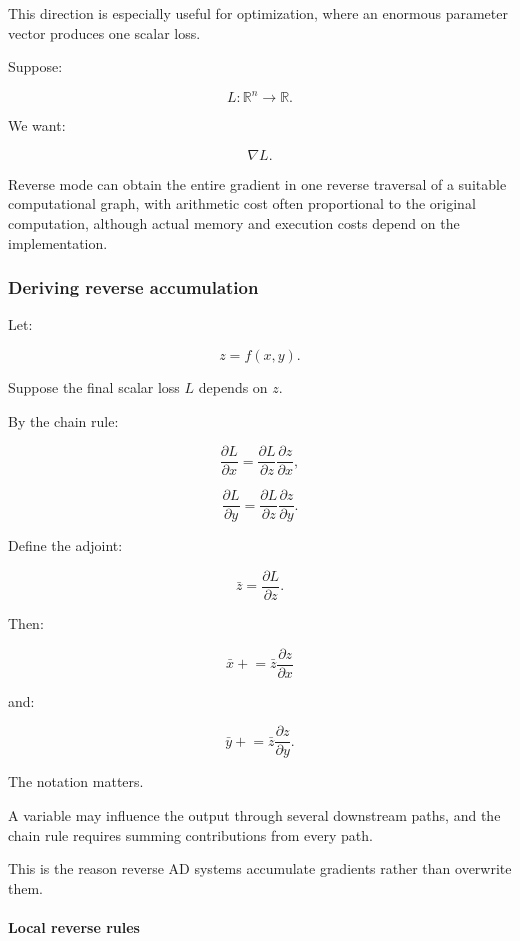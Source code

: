 This direction is especially useful for optimization, where an enormous parameter vector produces one scalar loss.

Suppose:

\[
L:\mathbb R^n\rightarrow\mathbb R.
\]

We want:

\[
\nabla L.
\]

Reverse mode can obtain the entire gradient in one reverse traversal of a suitable computational graph, with arithmetic cost often proportional to the original computation, although actual memory and execution costs depend on the implementation.

\subsubsection{Deriving reverse accumulation}\label{02-foundations-ii-ch022-deriving-reverse-accumulation}

\hypertarget{02-foundations-ii-ch022-deriving-reverse-accumulation}{}

Let:

\[
z=f(x,y).
\]

Suppose the final scalar loss \(L\) depends on \(z\).

By the chain rule:

\[
\frac{\partial L}{\partial x} = \frac{\partial L}{\partial z} \frac{\partial z}{\partial x},
\]

\[
\frac{\partial L}{\partial y} = \frac{\partial L}{\partial z} \frac{\partial z}{\partial y}.
\]

Define the adjoint:

\[
\bar z=\frac{\partial L}{\partial z}.
\]

Then:

\[
\boxed{ \bar x\mathrel{+}= \bar z\frac{\partial z}{\partial x} }
\]

and:

\[
\boxed{ \bar y\mathrel{+}= \bar z\frac{\partial z}{\partial y} }.
\]

The \BookInlineCode{{+}{=}}{+=} notation matters.

A variable may influence the output through several downstream paths, and the chain rule requires summing contributions from every path.

This is the reason reverse AD systems accumulate gradients rather than overwrite them.

\paragraph{Local reverse rules}\label{02-foundations-ii-ch022-local-reverse-rules}

